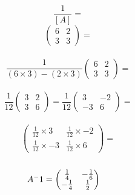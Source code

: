 \documentclass[a4paper,10pt]{article}
\begin{document}
      \begin{equation*}
        \frac{1}{[A]}
        =
      \end{equation*}
      \begin{equation*}
        \begin{pmatrix}
          6 & 2\\3 & 3
        \end{pmatrix}
        =
      \end{equation*}
      \\
      \begin{equation*}
        \frac{1}{(6 \times 3) - (2 \times 3)}
        \begin{pmatrix}
          6 & 2\\3 & 3
        \end{pmatrix}
        =
      \end{equation*}
      \\
      \begin{equation*}
        \frac{1}{12}
        \begin{pmatrix}
          3 & 2\\3 & 6
        \end{pmatrix}
        =
        \frac{1}{12}
        \begin{pmatrix}
          3 & -2\\-3 & 6
        \end{pmatrix}
        =
      \end{equation*}
      \\
      \begin{equation*}
        \begin{pmatrix}
          \frac{1}{12} \times 3 & \frac{1}{12} \times -2\\
          \frac{1}{12} \times -3 & \frac{1}{12} \times 6
        \end{pmatrix}
        =
      \end{equation*}
      \\
      \begin{equation*}
        A^-1 =
        \begin{pmatrix}
          \frac{1}{4} & -\frac{1}{6}\\-\frac{1}{4} & \frac{1}{2}
        \end{pmatrix}
        \hspace{0.4cm}
      \end{equation*}
      \newpage
\end{document}
